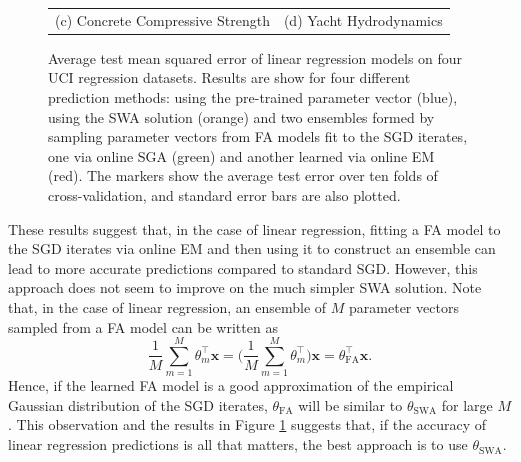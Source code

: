 \documentclass[msc,deptreport.inf]{infthesis} %
\newcommand{\matr}[1]{\mathbf{#1}}
\begin{document}
\begin{figure}[!htbp]
\begin{tabular}{cc}
		 (c) Concrete Compressive Strength 
		 & (d) Yacht Hydrodynamics \\[6pt]
	\end{tabular}
	\caption{Average test mean squared error of linear regression models on four UCI regression datasets. Results are show for four different prediction methods: using the pre-trained parameter vector (blue), using the SWA solution (orange) and two ensembles formed by sampling parameter vectors from FA models fit to the SGD iterates, one via online SGA (green) and another learned via online EM (red). The markers show the average test error over ten folds of cross-validation, and standard error bars are also plotted.}
	\label{fig:linear_regression_mse}
\end{figure}

These results suggest that, in the case of linear regression, fitting a FA model to the SGD iterates via online EM and then using it to construct an ensemble can lead to more accurate predictions compared to standard SGD. However, this approach does not seem to improve on the much simpler SWA solution. Note that, in the case of linear regression, an ensemble of $M$ parameter vectors sampled from a FA model can be written as 
\begin{equation}
	\frac{1}{M} \sum_{m=1}^M \theta_m^\intercal \matr{x} 
	= \Bigg( \frac{1}{M} \sum_{m=1}^M \theta_m^\intercal \Bigg) \matr{x} 
	= \theta_{\text{FA}}^\intercal \matr{x}.
\end{equation}
Hence, if the learned FA model is a good approximation of the empirical Gaussian distribution of the SGD iterates, $\theta_{\text{FA}}$ will be similar to $\theta_{\text{SWA}}$ for large $M$. This observation and the results in Figure \ref{fig:linear_regression_mse} suggests that, if the accuracy of linear regression predictions is all that matters, the best approach is to use $\theta_{\text{SWA}}$.
\end{document}
